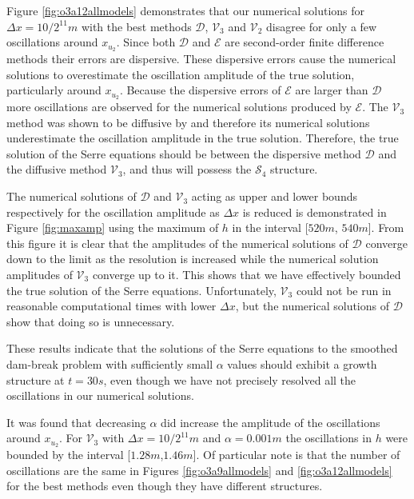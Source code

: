 \documentclass[times]{elsarticle}
\begin{document}
Figure \ref{fig:o3a12allmodels} demonstrates that our numerical solutions for $\Delta x = 10 /2^{11}m$ with the best methods $\mathcal{D}$, $\mathcal{V}_3$ and $\mathcal{V}_2$ disagree for only a few oscillations around $x_{u_2}$. Since both $\mathcal{D}$ and $\mathcal{E}$ are second-order finite difference methods their errors are dispersive. These dispersive errors cause the numerical solutions to overestimate the oscillation amplitude of the true solution, particularly around $x_{u_2}$. Because the dispersive errors of $\mathcal{E}$ are larger than $\mathcal{D}$ more oscillations are observed for the numerical solutions produced by $\mathcal{E}$. The $\mathcal{V}_3$ method was shown to be diffusive by \citet{Zoppou-etal-2017} and therefore its numerical solutions underestimate the oscillation amplitude in the true solution. Therefore, the true solution of the Serre equations should be between the dispersive method $\mathcal{D}$ and the diffusive method $\mathcal{V}_3$, and thus will possess the $\mathcal{S}_4$ structure.

The numerical solutions of $\mathcal{D}$ and $\mathcal{V}_3$ acting as upper and lower bounds respectively for the oscillation amplitude as $\Delta x$ is reduced is demonstrated in Figure \ref{fig:maxamp} using the maximum of $h$ in the interval [$520m$, $540m$]. From this figure it is clear that the amplitudes of the numerical solutions of $\mathcal{D}$ converge down to the limit as the resolution is increased while the numerical solution amplitudes of $\mathcal{V}_3$ converge up to it. This shows that we have effectively bounded the true solution of the Serre equations. Unfortunately, $\mathcal{V}_3$ could not be run in reasonable computational times with lower $\Delta x$, but the numerical solutions of $\mathcal{D}$ show that doing so is unnecessary.

These results indicate that the solutions of the Serre equations to the smoothed dam-break problem with sufficiently small $\alpha$ values should exhibit a growth structure at $t=30s$, even though we have not precisely resolved all the oscillations in our numerical solutions. 

It was found that decreasing $\alpha$ did increase the amplitude of the oscillations around $x_{u_2}$. For $\mathcal{V}_3$ with $\Delta x= 10/2^{11}m$ and $\alpha = 0.001m$ the oscillations in $h$ were bounded by the interval [$1.28m$,$1.46m$]. Of particular note is that the number of oscillations are the same in Figures \ref{fig:o3a9allmodels} and \ref{fig:o3a12allmodels} for the best methods even though they have different structures.
\end{document}
